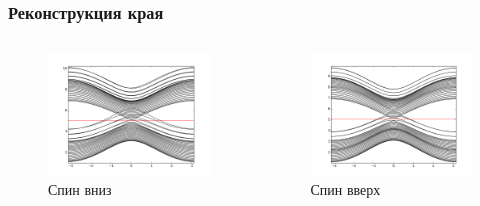 \documentclass{beamer}
\begin{document}
\begin{frame}
    \frametitle{Реконструкция края}
    \begin{columns}[T]
        \begin{column}{0.5\textwidth}
               \begin{figure}[h]
                   \includegraphics[width=0.99\linewidth]{reconstruction_spectrum_down.png}
                   \caption{Спин вниз}
               \end{figure}
        \end{column}
        \begin{column}{0.5\textwidth}
               \begin{figure}[h]
                   \includegraphics[width=0.99\linewidth]{reconstruction_spectrum_up.png}
                   \caption{Спин вверх}
               \end{figure}
        \end{column}
    \end{columns}
\end{frame}
\end{document}
